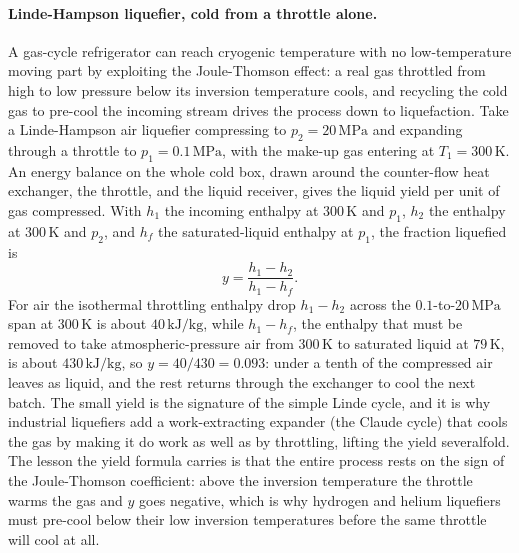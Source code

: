 \paragraph{Linde-Hampson liquefier, cold from a throttle alone.} A gas-cycle
refrigerator can reach cryogenic temperature with no low-temperature moving part
by exploiting the Joule-Thomson effect: a real gas throttled from high to low
pressure below its inversion temperature cools, and recycling the cold gas to
pre-cool the incoming stream drives the process down to liquefaction. Take a
Linde-Hampson air liquefier compressing to $p_2 = 20\,\text{MPa}$ and expanding
through a throttle to $p_1 = 0.1\,\text{MPa}$, with the make-up gas entering at
$T_1 = 300\,\si{\kelvin}$. An energy balance on the whole cold box, drawn around
the counter-flow heat exchanger, the throttle, and the liquid receiver, gives the
liquid yield per unit of gas compressed. With $h_1$ the incoming enthalpy at
$300\,\si{\kelvin}$ and $p_1$, $h_2$ the enthalpy at $300\,\si{\kelvin}$ and
$p_2$, and $h_f$ the saturated-liquid enthalpy at $p_1$, the fraction liquefied is
\[
y = \frac{h_1 - h_2}{h_1 - h_f}.
\]
For air the isothermal throttling enthalpy drop $h_1 - h_2$ across the
$0.1$-to-$20\,\text{MPa}$ span at $300\,\si{\kelvin}$ is about $40\,\text{kJ}/
\text{kg}$, while $h_1 - h_f$, the enthalpy that must be removed to take
atmospheric-pressure air from $300\,\si{\kelvin}$ to saturated liquid at
$79\,\si{\kelvin}$, is about $430\,\text{kJ}/\text{kg}$, so $y = 40/430 = 0.093$:
under a tenth of the compressed air leaves as liquid, and the rest returns
through the exchanger to cool the next batch. The small yield is the signature of
the simple Linde cycle, and it is why industrial liquefiers add a work-extracting
expander (the Claude cycle) that cools the gas by making it do work as well as by
throttling, lifting the yield severalfold. The lesson the yield formula carries
is that the entire process rests on the sign of the Joule-Thomson coefficient:
above the inversion temperature the throttle warms the gas and $y$ goes negative,
which is why hydrogen and helium liquefiers must pre-cool below their low
inversion temperatures before the same throttle will cool at all.

